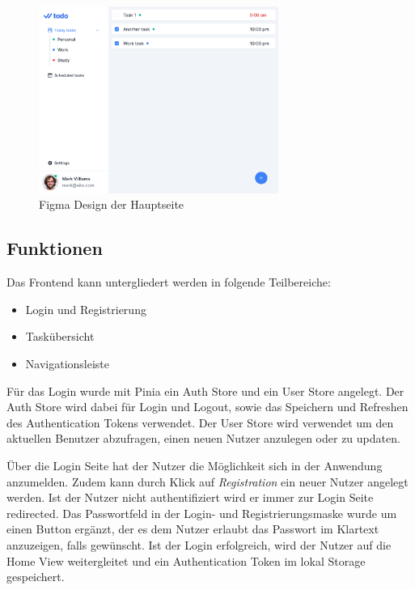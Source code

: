 \documentclass[a4paper, 12pt]{article}
\begin{document}
    \begin{figure}[H]
        \center\includegraphics[width=0.7\textwidth]{../images/figma/main}
        \caption{Figma Design der Hauptseite}\label{fig:figure}
    \end{figure}

    \subsection{Funktionen}
    Das Frontend kann untergliedert werden in folgende Teilbereiche:

    \begin{itemize}
        \item Login und Registrierung
        \item Taskübersicht
        \item Navigationsleiste
    \end{itemize}

    Für das Login wurde mit Pinia ein Auth Store und ein User Store angelegt. Der Auth Store wird dabei für Login und
    Logout, sowie das Speichern und Refreshen des Authentication Tokens verwendet. Der User Store wird verwendet um den
    aktuellen Benutzer abzufragen, einen neuen Nutzer anzulegen oder zu updaten.
    
    Über die Login Seite hat der Nutzer die Möglichkeit sich in der Anwendung anzumelden. Zudem kann durch Klick auf
    {\it Registration} ein neuer Nutzer angelegt werden. Ist der Nutzer nicht authentifiziert wird er immer zur Login
    Seite redirected. Das Passwortfeld in der Login- und Registrierungsmaske wurde um einen Button ergänzt, der es dem
    Nutzer erlaubt das Passwort im Klartext anzuzeigen, falls gewünscht. Ist der Login erfolgreich, wird der Nutzer auf
    die Home View weitergleitet und ein Authentication Token im lokal Storage gespeichert.
\end{document}
